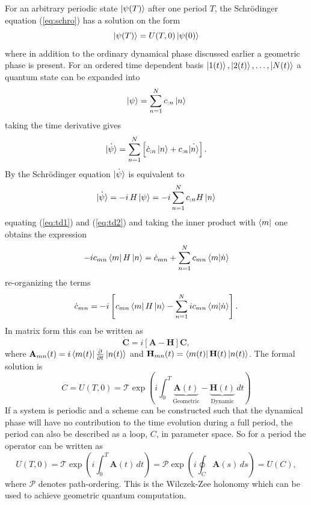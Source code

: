 For an arbitrary periodic state $\ket{\psi(T)}$ after one period $T$, the Schrödinger equation (\ref{eq:schro}) has a solution on the form 
\begin{equation}
\label{eq:gen_sol}
\ket{\psi(T)} = U(T,0)\ket{\psi(0)}
\end{equation}
where in addition to the ordinary dynamical phase discussed earlier a geometric phase is present. For an ordered time dependent basis $\ket{1(t)}, \ket{2(t)},\dots, \ket{N(t)}$ a quantum state can be expanded into 
\begin{equation}
\ket{\psi} = \sum_{n = 1}^N c_{:n}\ket{n}
\end{equation}
taking the time derivative gives
\begin{equation}
\label{eq:td1}
\dot{\ket{\psi}} = \sum_{n = 1}^N \left[\dot{c}_{:n}\ket{n} + c_{:n}\dot{\ket{n}} \right].
\end{equation}
By the Schrödinger equation $\dot{\ket{\psi}}$ is equivalent to
\begin{equation}
\label{eq:td2}
\dot{\ket{\psi}} = -i\,H\ket{\psi} = -i\sum_{n = 1}^N c_{:n}H\ket{n}
\end{equation}
equating (\ref{eq:td1}) and (\ref{eq:td2}) and taking the inner product with $\bra{m}$ one obtains the expression
\begin{equation}
-i c_{mn}\bra{m}H\ket{n} = \dot{c}_{mn} + \sum_{n = 1}^N c_{mn} \bra{m}\ket{\dot{n}}
\end{equation}
re-organizing the terms  
\begin{equation}
\dot{c}_{mn} = -i\left[c_{mn}\bra{m}H\ket{n} - \sum_{n = 1}^N i c_{mn} \bra{m}\ket{\dot{n}} \right].
\end{equation}
In matrix form this can be written as 
\begin{equation}
\dot{\mathbf{C}} = i\left[\mathbf{A} - \mathbf{H} \right]\mathbf{C},
\end{equation}
where $\mathbf{A}_{mn}(t) = i\bra{m(t)}\pdv{}{t}\ket{n(t)}$ and
$\mathbf{H}_{mn}(t) = \bra{m(t)}\mathbf{H}(t)\ket{n(t)}$. The formal solution is 
\begin{equation}
\label{eq:unitary}
C = U(T,0) = \mathcal{T}\exp\left(i\int_{0}^{T} \underbrace{\mathbf{A}(t)}_{\text{Geometric}} - \underbrace{\mathbf{H}(t)}_{\text{Dynamic}}\,dt\right)
\end{equation}
If a system is periodic and a scheme can be constructed such that the dynamical phase will have no contribution to the time evolution during a full period, the period can also be described as a loop, $C$, in parameter space. So for a period the operator can be written as
\begin{equation}
U(T,0) = \mathcal{T}\exp\left(i\int_{0}^{T}\mathbf{A}(t)\,dt\right) = \mathcal{P}\exp\left(i\oint_{C}\mathbf{A}(s)\,ds\right) = U(C),
\end{equation}
where $\mathcal{P}$ denotes path-ordering. This is the Wilczek-Zee holonomy which can be used to achieve geometric quantum computation. 

